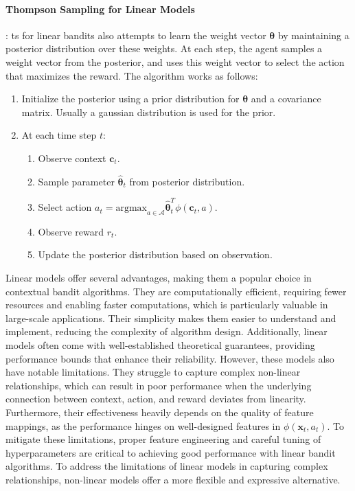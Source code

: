 \paragraph{Thompson Sampling for Linear Models}: \acf{ts} for linear bandits also attempts to learn the weight vector $\boldsymbol{\theta}$ by maintaining a posterior distribution over these weights. At each step, the agent samples a weight vector from the posterior, and uses this weight vector to select the action that maximizes the reward. The algorithm works as follows:
    \begin{enumerate}
    \item Initialize the posterior using a prior distribution for $\boldsymbol{\theta}$ and a covariance matrix. Usually a gaussian distribution is used for the prior.
    \item At each time step $t$:
      \begin{enumerate}
        \item Observe context $\mathbf{c}_t$.
        \item Sample parameter $\hat{\boldsymbol{\theta}}_t$ from posterior distribution.
        \item Select action $a_t = \text{argmax}_{a \in \mathcal{A}} \hat{\boldsymbol{\theta}}_t^T \phi(\mathbf{c}_t, a)$.
        \item Observe reward $r_t$.
        \item Update the posterior distribution based on observation.
      \end{enumerate}
    \end{enumerate}

Linear models offer several advantages, making them a popular choice in contextual bandit algorithms. They are computationally efficient, requiring fewer resources and enabling faster computations, which is particularly valuable in large-scale applications. Their simplicity makes them easier to understand and implement, reducing the complexity of algorithm design. Additionally, linear models often come with well-established theoretical guarantees, providing performance bounds that enhance their reliability. However, these models also have notable limitations. They struggle to capture complex non-linear relationships, which can result in poor performance when the underlying connection between context, action, and reward deviates from linearity. Furthermore, their effectiveness heavily depends on the quality of feature mappings, as the performance hinges on well-designed features in $\phi(\mathbf{x}_t, a_t)$. To mitigate these limitations, proper feature engineering and careful tuning of hyperparameters are critical to achieving good performance with linear bandit algorithms.
To address the limitations of linear models in capturing complex relationships, non-linear models offer a more flexible and expressive alternative. 


